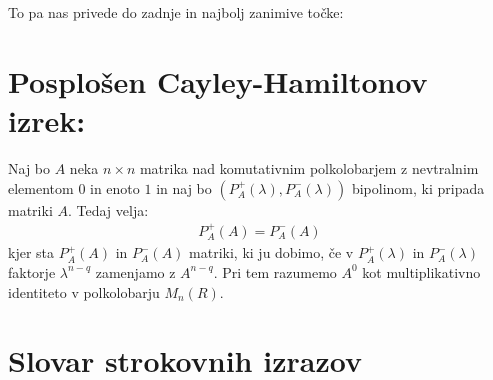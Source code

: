 \documentclass[mat1]{fmfdelo}
\begin{document}
To pa nas privede do zadnje in najbolj zanimive točke:
\newpage
\section{Posplošen Cayley-Hamiltonov izrek:}

\begin{izrek}

Naj bo $A$ neka $n\times n$ matrika nad komutativnim polkolobarjem z nevtralnim elementom $0$ in enoto $1$ in naj bo $(P^{+}_A(\lambda), P^{-}_A(\lambda))$ bipolinom, ki pripada matriki $A$. Tedaj velja: \begin{align}
		P^{+}_A(A) = P^{-}_A(A)
	\end{align}
	kjer sta $P^{+}_A(A)$ in $P^{-}_A(A)$ matriki, ki ju dobimo, če v $P^{+}_A(\lambda)$ in $P^{-}_A(\lambda)$ faktorje $\lambda^{n-q}$ zamenjamo z $A^{n-q}$. Pri tem razumemo $A^0$ kot multiplikativno identiteto v polkolobarju $M_n(R)$.

\end{izrek}

\section*{Slovar strokovnih izrazov}

\end{document}
